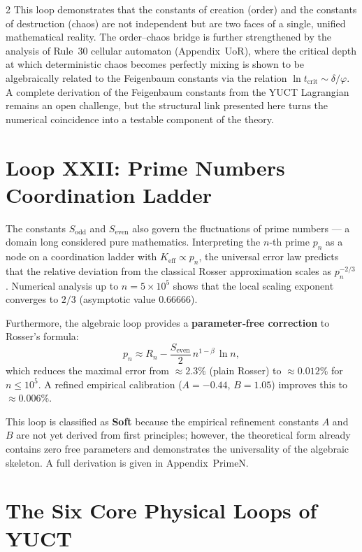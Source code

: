 \documentclass[12pt,a4paper]{article}
\begin{document}
\begin{multicols}{2}
		This loop demonstrates that the constants of creation (order) and the
		constants of destruction (chaos) are not independent but are two faces of
		a single, unified mathematical reality.  The order–chaos bridge is further
		strengthened by the analysis of Rule~30 cellular automaton (Appendix~UoR),
		where the critical depth at which deterministic chaos becomes perfectly
		mixing is shown to be algebraically related to the Feigenbaum constants
		via the relation \(\ln t_{\mathrm{crit}} \sim \delta/\varphi\).
		A complete derivation of the Feigenbaum constants from the YUCT
		Lagrangian remains an open challenge, but the structural link presented
		here turns the numerical coincidence into a testable component of the
		theory.
		
		\section{Loop XXII: Prime Numbers Coordination Ladder}
		
		The constants \(S_{\mathrm{odd}}\) and \(S_{\mathrm{even}}\) also govern the fluctuations of prime numbers — a domain long considered pure mathematics. Interpreting the \(n\)-th prime \(p_n\) as a node on a coordination ladder with \(K_{\mathrm{eff}} \propto p_n\), the universal error law predicts that the relative deviation from the classical Rosser approximation scales as \(p_n^{-2/3}\). Numerical analysis up to \(n = 5\times10^5\) shows that the local scaling exponent converges to \(2/3\) (asymptotic value \(0.66666\)).
		
		Furthermore, the algebraic loop provides a \textbf{parameter‑free correction} to Rosser’s formula:
		\[
		p_n \approx R_n - \frac{S_{\mathrm{even}}}{2}\, n^{1-\beta}\,\ln n,
		\]
		which reduces the maximal error from \(\approx 2.3\%\) (plain Rosser) to \(\approx 0.012\%\) for \(n\le 10^5\). A refined empirical calibration (\(A = -0.44\), \(B = 1.05\)) improves this to \(\approx 0.006\%\).
		
		This loop is classified as \textbf{Soft} because the empirical refinement constants \(A\) and \(B\) are not yet derived from first principles; however, the theoretical form already contains zero free parameters and demonstrates the universality of the algebraic skeleton. A full derivation is given in Appendix~PrimeN.
		
	\end{multicols}
	
	\section*{The Six Core Physical Loops of YUCT}
	
\end{document}
